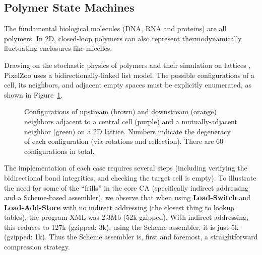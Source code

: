 \documentclass{acm_proc_article-sp}
\begin{document}
\subsection{Polymer State Machines}
\label{sec:PolymerStateMachines}

The fundamental biological molecules (DNA, RNA and proteins) are all polymers.
In 2D, closed-loop polymers can also represent thermodynamically fluctuating enclosures like micelles.

Drawing on the stochastic physics of polymers \cite{DoiEdwards1988}
and their simulation on lattices \cite{PhysRevLett.64.1915,journals/pc/OstrovskyCSB01},
PixelZoo uses a bidirectionally-linked list model.
The possible configurations of a cell, its neighbors, and adjacent empty spaces must
be explicitly enumerated, as shown in Figure~\ref{fig:polymer}.

\begin{figure}
\caption{
\label{fig:polymer}
Configurations of upstream (brown) and downstream (orange) neighbors adjacent to a central cell (purple) and a mutually-adjacent neighbor (green) on a 2D lattice.
Numbers indicate the degeneracy of each configuration (via rotations and reflection).
There are 60 configurations in total.
}
\end{figure}

The implementation of each case requires several steps (including verifying the bidirectional bond integrities,
and checking the target cell is empty).
To illustrate the need for some of the ``frills'' in the core CA
(specifically indirect addressing and a Scheme-based assembler),
we observe that when using {\bf Load-Switch} and {\bf Load-Add-Store}
with no indirect addressing (the closest thing to lookup tables), the program XML was 2.3Mb (52k gzipped).
With indirect addressing, this reduces to 127k (gzipped: 3k);
using the Scheme assembler, it is just 5k (gzipped: 1k).
Thus the Scheme assembler is, first and foremost, a straightforward compression strategy.
\end{document}

